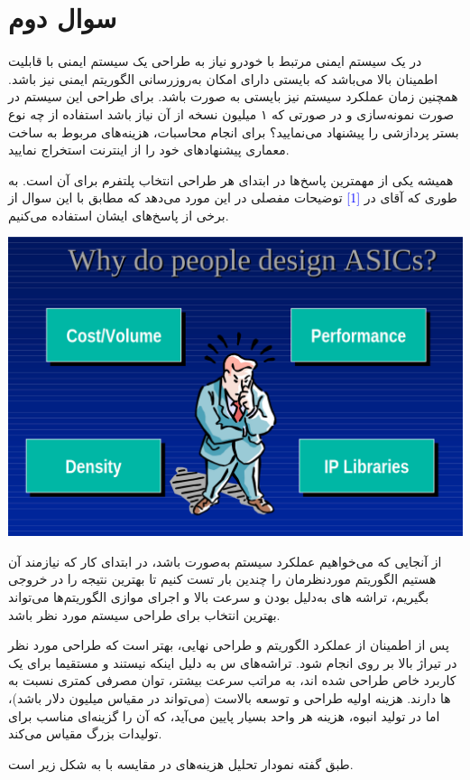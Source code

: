 \section{سوال دوم}
در یک سیستم ایمنی مرتبط با خودرو نیاز به طراحی یک سیستم ایمنی با قابلیت اطمینان بالا می‌باشد که بایستی دارای امکان به‌روزرسانی الگوریتم ایمنی نیز باشد. همچنین زمان عملکرد سیستم نیز بایستی به صورت  باشد. برای طراحی این سیستم در صورت نمونه‌سازی و در صورتی که ۱ میلیون نسخه از آن نیاز باشد استفاده از چه نوع بستر پردازشی را پیشنهاد می‌نمایید؟ برای انجام محاسبات، هزینه‌های مربوط به ساخت معماری پیشنهادهای خود را از اینترنت استخراج نمایید.



\begin{qsolve}
	
	همیشه یکی از مهمترین پاسخ‌ها در ابتدای هر طراحی انتخاب پلتفرم برای آن است. به طوری که آقای  در \textcolor{blue}{[1]} توضیحات مفصلی در این مورد می‌دهد که مطابق با این سوال از برخی از پاسخ‌های ایشان استفاده می‌کنیم.
	
	
\begin{center}
	\includegraphics*[width=0.8\linewidth]{pics/img4.png}
	\label{اف‌پی‌جی‌ای یا ایسیک؟}
\end{center}

	
	
	
	از آنجایی که می‌خواهیم عملکرد سیستم به‌صورت  باشد، در ابتدای کار که نیازمند آن هستیم الگوریتم موردنظرمان را چندین بار تست کنیم تا بهترین نتیجه را در خروجی بگیریم، تراشه های 
به‌دلیل  بودن و سرعت بالا و اجرای موازی الگوریتم‌ها می‌تواند بهترین انتخاب برای طراحی سیستم مورد نظر باشد.

پس از اطمینان از عملکرد الگوریتم و طراحی نهایی، بهتر است که طراحی مورد نظر در تیراژ بالا بر روی  انجام شود. تراشه‌های س به دلیل اینکه  نیستند و مستقیما برای یک کاربرد خاص طراحی شده اند، به مراتب سرعت بیشتر، توان مصرفی کمتری نسبت به  ها دارند. هزینه اولیه طراحی و توسعه  بالاست (می‌تواند در مقیاس میلیون دلار باشد)، اما در تولید انبوه، هزینه هر واحد بسیار پایین می‌آید، که آن را گزینه‌ای مناسب برای تولیدات بزرگ مقیاس می‌کند.




طبق گفته  نمودار تحلیل هزینه‌های  در مقایسه با  به شکل زیر است. 


	
	
\end{qsolve}


